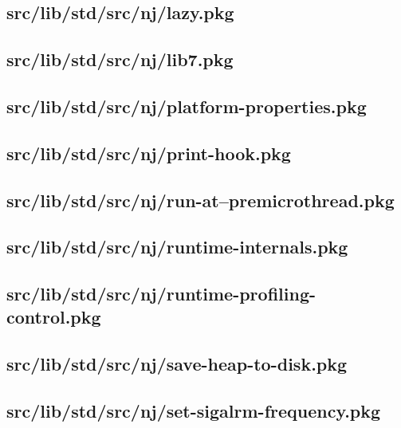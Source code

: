 \subsection{src/lib/std/src/nj/lazy.pkg}


\subsection{src/lib/std/src/nj/lib7.pkg}


\subsection{src/lib/std/src/nj/platform-properties.pkg}


\subsection{src/lib/std/src/nj/print-hook.pkg}


\subsection{src/lib/std/src/nj/run-at--premicrothread.pkg}


\subsection{src/lib/std/src/nj/runtime-internals.pkg}


\subsection{src/lib/std/src/nj/runtime-profiling-control.pkg}


\subsection{src/lib/std/src/nj/save-heap-to-disk.pkg}


\subsection{src/lib/std/src/nj/set-sigalrm-frequency.pkg}


